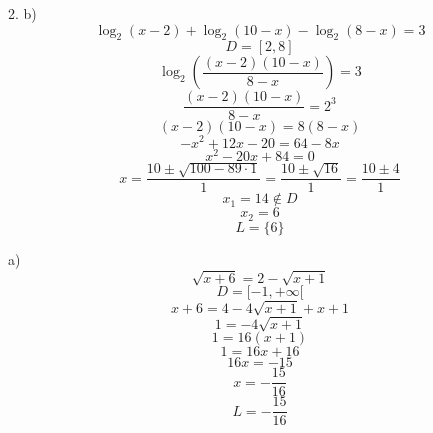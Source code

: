 \documentclass{article}
\begin{document}
2. b)
\[ \log_2(x-2) + \log_2(10-x) - \log_2(8-x) = 3 \]
\[ D = [2, 8] \]
\[ \log_2 \left( \frac{(x-2)(10-x)}{8-x} \right) = 3 \]
\[ \frac{(x-2)(10-x)}{8-x} = 2^3 \]
\[ (x-2)(10-x) = 8(8-x) \]
\[ -x^2+12x-20 = 64-8x \]
\[ x^2-20x+84 = 0 \]
\[ x = \frac{10 \pm \sqrt{100-89\cdot1}}{1} = \frac{10 \pm \sqrt{16}}{1} = \frac{10 \pm 4}{1} \]
\[ x_1 = 14 \notin D \]
\[ x_2 = 6 \]
\[ L = \{6\} \]

a)
\[ \sqrt{x+6} = 2 - \sqrt{x+1} \]
\[ D = [-1, +\infty[ \]
\[ x+6 = 4 - 4\sqrt{x+1} + x+1 \]
\[ 1 = -4\sqrt{x+1} \]
\[ 1 = 16(x+1) \]
\[ 1 = 16x+16 \]
\[ 16x = -15 \]
\[ x = -\frac{15}{16} \]
\[ L = -\frac{15}{16} \]
\end{document}

